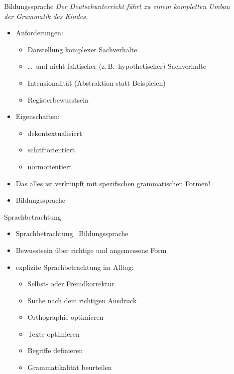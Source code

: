 \begin{frame}
  {Bildungssprache}
  \onslide<+->
  \onslide<+->
  \alert{\textit{Der Deutschunterricht führt zu einem kompletten Umbau\\
  der Grammatik des Kindes.}} \\
  \Zeile
  \begin{itemize}[<+->]
    \item Anforderungen:
    \begin{itemize}[<+->]
      \item Darstellung komplexer Sachverhalte
      \item \dots\ und nicht-faktischer (z.\,B.\ hypothetischer) Sachverhalte
      \item Intensionalität (Abstraktion statt Beispielen)
      \item Registerbewusstsein
    \end{itemize}
       \Halbzeile 
      \item Eigenschaften:
    \begin{itemize}[<+->]
      \item dekontextualisiert
      \item schriftorientiert
      \item normorientiert
    \end{itemize}
        \Halbzeile
      \item \alert{Das alles ist verknüpft mit spezifischen grammatischen Formen!}
      \item[\ding{222}] \alert{Bildungssprache}
  \end{itemize}
\end{frame}

\begin{frame}
  {Sprachbetrachtung}
  \onslide<+->
  \begin{itemize}[<+->]
    \item \alert{Sprachbetrachtung \ Bildungssprache}
     \Zeile 
    \item Bewusstsein über richtige und angemessene Form
     \Zeile 
    \item explizite Sprachbetrachtung im Alltag:
      \Halbzeile
      \begin{itemize}[<+->]
        \item Selbst- oder Fremdkorrektur
        \item Suche nach dem richtigen Ausdruck
        \item Orthographie optimieren
        \item Texte optimieren
        \item Begriffe definieren
        \item Grammatikalität beurteilen
      \end{itemize}
  \end{itemize}
\end{frame}

